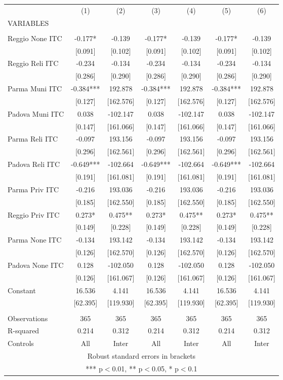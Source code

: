 \begin{tabular}{lcccccc} \hline
 & (1) & (2) & (3) & (4) & (5) & (6) \\
VARIABLES &  &  &  &  &  &  \\ \hline
 &  &  &  &  &  &  \\
Reggio None ITC & -0.177* & -0.139 & -0.177* & -0.139 & -0.177* & -0.139 \\
 & [0.091] & [0.102] & [0.091] & [0.102] & [0.091] & [0.102] \\
Reggio Reli ITC & -0.234 & -0.134 & -0.234 & -0.134 & -0.234 & -0.134 \\
 & [0.286] & [0.290] & [0.286] & [0.290] & [0.286] & [0.290] \\
Parma Muni ITC & -0.384*** & 192.878 & -0.384*** & 192.878 & -0.384*** & 192.878 \\
 & [0.127] & [162.576] & [0.127] & [162.576] & [0.127] & [162.576] \\
Padova Muni ITC & 0.038 & -102.147 & 0.038 & -102.147 & 0.038 & -102.147 \\
 & [0.147] & [161.066] & [0.147] & [161.066] & [0.147] & [161.066] \\
Parma Reli ITC & -0.097 & 193.156 & -0.097 & 193.156 & -0.097 & 193.156 \\
 & [0.296] & [162.561] & [0.296] & [162.561] & [0.296] & [162.561] \\
Padova Reli ITC & -0.649*** & -102.664 & -0.649*** & -102.664 & -0.649*** & -102.664 \\
 & [0.191] & [161.081] & [0.191] & [161.081] & [0.191] & [161.081] \\
Parma Priv ITC & -0.216 & 193.036 & -0.216 & 193.036 & -0.216 & 193.036 \\
 & [0.185] & [162.550] & [0.185] & [162.550] & [0.185] & [162.550] \\
Reggio Priv ITC & 0.273* & 0.475** & 0.273* & 0.475** & 0.273* & 0.475** \\
 & [0.149] & [0.228] & [0.149] & [0.228] & [0.149] & [0.228] \\
Parma None ITC & -0.134 & 193.142 & -0.134 & 193.142 & -0.134 & 193.142 \\
 & [0.126] & [162.570] & [0.126] & [162.570] & [0.126] & [162.570] \\
Padova None ITC & 0.128 & -102.050 & 0.128 & -102.050 & 0.128 & -102.050 \\
 & [0.126] & [161.067] & [0.126] & [161.067] & [0.126] & [161.067] \\
Constant & 16.536 & 4.141 & 16.536 & 4.141 & 16.536 & 4.141 \\
 & [62.395] & [119.930] & [62.395] & [119.930] & [62.395] & [119.930] \\
 &  &  &  &  &  &  \\
Observations & 365 & 365 & 365 & 365 & 365 & 365 \\
R-squared & 0.214 & 0.312 & 0.214 & 0.312 & 0.214 & 0.312 \\
 Controls & All & Inter & All & Inter & All & Inter \\ \hline
\multicolumn{7}{c}{ Robust standard errors in brackets} \\
\multicolumn{7}{c}{ *** p$<$0.01, ** p$<$0.05, * p$<$0.1} \\
\end{tabular}
